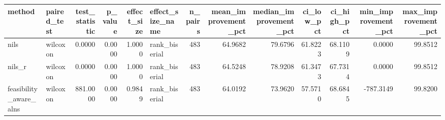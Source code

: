 \begin{tabular}{llrrrlrrrrrrr}
\toprule
method & paired_test & test_statistic & p_value & effect_size & effect_size_name & n_pairs & mean_improvement_pct & median_improvement_pct & ci_low_pct & ci_high_pct & min_improvement_pct & max_improvement_pct \\
\midrule
nils & wilcoxon & 0.0000 & 0.0000 & 1.0000 & rank_biserial & 483 & 64.9682 & 79.6796 & 61.8223 & 68.1109 & 0.0000 & 99.8512 \\
nils_r & wilcoxon & 0.0000 & 0.0000 & 1.0000 & rank_biserial & 483 & 64.5248 & 78.9208 & 61.3473 & 67.7314 & 0.0000 & 99.8512 \\
feasibility_aware_alns & wilcoxon & 881.0000 & 0.0000 & 0.9849 & rank_biserial & 483 & 64.0192 & 73.9620 & 57.5710 & 68.6845 & -787.3149 & 99.8200 \\
\bottomrule
\end{tabular}

